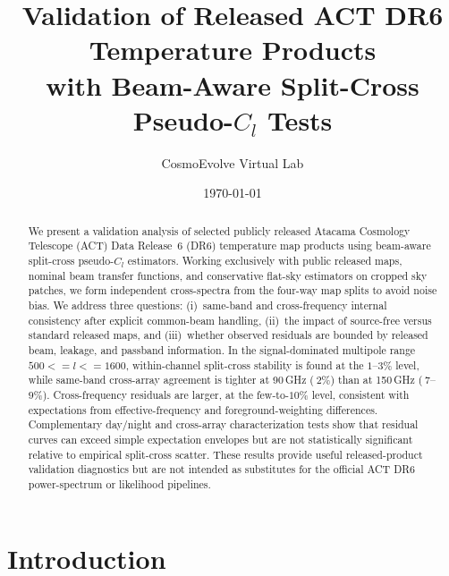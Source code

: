 \documentclass[twocolumn,showpacs,preprintnumbers,amsmath,amssymb,floatfix,prd]{revtex4-2}
\def\ell{l}%
\def\sim{~}%
\def\le{<=}%
\begin{document}
\title{Validation of Released ACT DR6 Temperature Products\\with Beam-Aware Split-Cross Pseudo-$C_\ell$ Tests}

\author{CosmoEvolve Virtual Lab}

\date{\today}

\begin{abstract}
We present a validation analysis of selected publicly released Atacama Cosmology Telescope (ACT) Data Release~6 (DR6) temperature map products using beam-aware split-cross pseudo-$C_\ell$ estimators.
Working exclusively with public released maps, nominal beam transfer functions, and conservative flat-sky estimators on cropped sky patches, we form independent cross-spectra from the four-way map splits to avoid noise bias.
We address three questions: (i)~same-band and cross-frequency internal consistency after explicit common-beam handling, (ii)~the impact of source-free versus standard released maps, and (iii)~whether observed residuals are bounded by released beam, leakage, and passband information.
In the signal-dominated multipole range $500 \le \ell \le 1600$, within-channel split-cross stability is found at the $1$--$3\%$ level, while same-band cross-array agreement is tighter at 90\,GHz ($\sim\!2\%$) than at 150\,GHz ($\sim\!7$--$9\%$).
Cross-frequency residuals are larger, at the few-to-$10\%$ level, consistent with expectations from effective-frequency and foreground-weighting differences.
Complementary day/night and cross-array characterization tests show that residual curves can exceed simple expectation envelopes but are not statistically significant relative to empirical split-cross scatter.
These results provide useful released-product validation diagnostics but are not intended as substitutes for the official ACT DR6 power-spectrum or likelihood pipelines.
\end{abstract}


\maketitle

\section{Introduction}\label{sec:intro}
\end{document}
